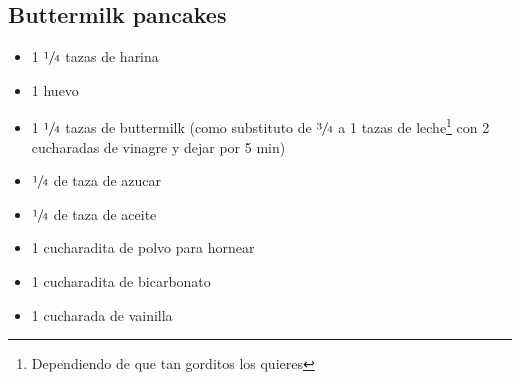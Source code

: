 \subsection{Buttermilk pancakes}

\begin{itemize}
\item 1 $\sfrac{1}{4}$ tazas de harina
\item 1 huevo
\item 1 $\sfrac{1}{4}$ tazas de buttermilk (como substituto  de  $\sfrac{3}{4}$ a 1 tazas de leche\footnote{Dependiendo de que tan gorditos los quieres} con 2 cucharadas de vinagre y dejar por 5 min)
\item $\sfrac{1}{4}$ de taza de azucar
\item $\sfrac{1}{4}$ de taza de aceite
\item 1 cucharadita de polvo para hornear
\item 1 cucharadita de bicarbonato
\item 1 cucharada de vainilla
\end{itemize}
